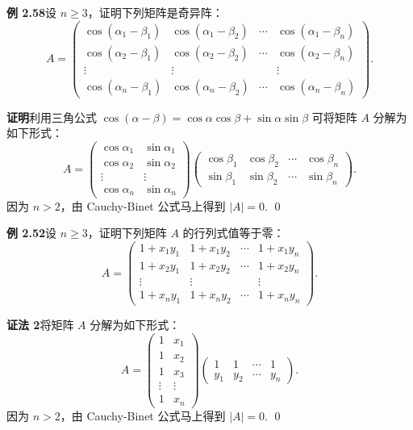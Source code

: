 \documentclass[UTF8, 12pt, fontset=fandol, oneside]{ctexart}
\begin{document}
\noindent\textbf{例 2.58}\quad 设 $n\ge3$，证明下列矩阵是奇异阵：
\[
A=
\left(
\begin{array}{cccc}
\cos(\alpha_1-\beta_1) & \cos(\alpha_1-\beta_2) & \cdots & \cos(\alpha_1-\beta_n)\\
\cos(\alpha_2-\beta_1) & \cos(\alpha_2-\beta_2) & \cdots & \cos(\alpha_2-\beta_n)\\
\vdots & \vdots & & \vdots\\
\cos(\alpha_n-\beta_1) & \cos(\alpha_n-\beta_2) & \cdots & \cos(\alpha_n-\beta_n)
\end{array}
\right).
\]

\noindent\textbf{证明}\quad 利用三角公式 $\cos(\alpha-\beta)=\cos\alpha\cos\beta+\sin\alpha\sin\beta$ 可将矩阵 $A$ 分解为如下形式：
\[
A=
\left(
\begin{array}{cc}
\cos\alpha_1 & \sin\alpha_1\\
\cos\alpha_2 & \sin\alpha_2\\
\vdots & \vdots\\
\cos\alpha_n & \sin\alpha_n
\end{array}
\right)
\left(
\begin{array}{cccc}
\cos\beta_1 & \cos\beta_2 & \cdots & \cos\beta_n\\
\sin\beta_1 & \sin\beta_2 & \cdots & \sin\beta_n
\end{array}
\right).
\]
因为 $n>2$，由 Cauchy-Binet 公式马上得到 $|A|=0$. \qed

\noindent\textbf{例 2.52}\quad 设 $n\ge3$，证明下列矩阵 $A$ 的行列式值等于零：
\[
A=
\left(
\begin{array}{cccc}
1+x_1y_1 & 1+x_1y_2 & \cdots & 1+x_1y_n\\
1+x_2y_1 & 1+x_2y_2 & \cdots & 1+x_2y_n\\
\vdots & \vdots & & \vdots\\
1+x_ny_1 & 1+x_ny_2 & \cdots & 1+x_ny_n
\end{array}
\right).
\]

\noindent\textbf{证法 2}\quad 将矩阵 $A$ 分解为如下形式：
\[
A=
\left(
\begin{array}{cc}
1 & x_1\\
1 & x_2\\
1 & x_3\\
\vdots & \vdots\\
1 & x_n
\end{array}
\right)
\left(
\begin{array}{cccc}
1 & 1 & \cdots & 1\\
y_1 & y_2 & \cdots & y_n
\end{array}
\right).
\]
因为 $n>2$，由 Cauchy-Binet 公式马上得到 $|A|=0$. \qed
\end{document}
